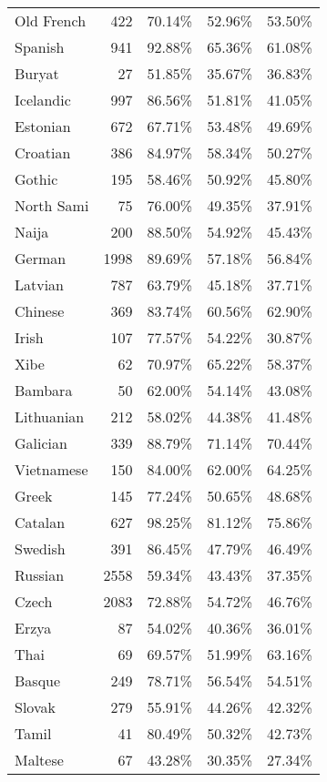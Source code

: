 \begin{longtable}{lrrrr}
    Old French & 422 & 70.14\% & 52.96\% & 53.50\% \\
    Spanish & 941 & 92.88\% & 65.36\% & 61.08\% \\
    Buryat & 27 & 51.85\% & 35.67\% & 36.83\% \\
    Icelandic & 997 & 86.56\% & 51.81\% & 41.05\% \\
    Estonian & 672 & 67.71\% & 53.48\% & 49.69\% \\
    Croatian & 386 & 84.97\% & 58.34\% & 50.27\% \\
    Gothic & 195 & 58.46\% & 50.92\% & 45.80\% \\
    North Sami & 75 & 76.00\% & 49.35\% & 37.91\% \\
    Naija & 200 & 88.50\% & 54.92\% & 45.43\% \\
    German & 1998 & 89.69\% & 57.18\% & 56.84\% \\
    Latvian & 787 & 63.79\% & 45.18\% & 37.71\% \\
    Chinese & 369 & 83.74\% & 60.56\% & 62.90\% \\
    Irish & 107 & 77.57\% & 54.22\% & 30.87\% \\
    Xibe & 62 & 70.97\% & 65.22\% & 58.37\% \\
    Bambara & 50 & 62.00\% & 54.14\% & 43.08\% \\
    Lithuanian & 212 & 58.02\% & 44.38\% & 41.48\% \\
    Galician & 339 & 88.79\% & 71.14\% & 70.44\% \\
    Vietnamese & 150 & 84.00\% & 62.00\% & 64.25\% \\
    Greek & 145 & 77.24\% & 50.65\% & 48.68\% \\
    Catalan & 627 & 98.25\% & 81.12\% & 75.86\% \\
    Swedish & 391 & 86.45\% & 47.79\% & 46.49\% \\
    Russian & 2558 & 59.34\% & 43.43\% & 37.35\% \\
    Czech & 2083 & 72.88\% & 54.72\% & 46.76\% \\
    Erzya & 87 & 54.02\% & 40.36\% & 36.01\% \\
    Thai & 69 & 69.57\% & 51.99\% & 63.16\% \\
    Basque & 249 & 78.71\% & 56.54\% & 54.51\% \\
    Slovak & 279 & 55.91\% & 44.26\% & 42.32\% \\
    Tamil & 41 & 80.49\% & 50.32\% & 42.73\% \\
    Maltese & 67 & 43.28\% & 30.35\% & 27.34\% \\

\end{longtable}
